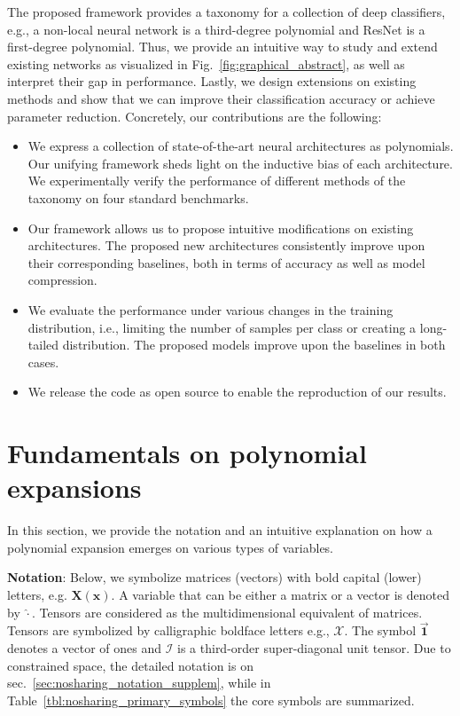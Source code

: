 \documentclass[runningheads]{llncs}
\newcommand{\resnet}{ResNet}
\providecommand{\bmcal}[1]{\bm{\mathcal{#1}}}
\providecommand\eg{e.g.,}
\begin{document}
The proposed framework provides a taxonomy for a collection of deep classifiers, \eg{} a non-local neural network is a third-degree polynomial and \resnet{} is a first-degree polynomial. 
Thus, we provide an intuitive way to study and extend existing networks as visualized in Fig.~\ref{fig:graphical_abstract}, as well as interpret their gap in performance. Lastly, we design extensions on existing methods and show that we can improve their classification accuracy or achieve parameter reduction. 
Concretely, our contributions are the following:
\begin{itemize}
    \item We express a collection of state-of-the-art neural architectures as polynomials. Our unifying framework sheds light on the inductive bias of each architecture. We experimentally verify the performance of different methods of the taxonomy on four standard benchmarks. 
    \item Our framework allows us to propose intuitive modifications on existing architectures. The proposed new architectures consistently improve upon their corresponding baselines, both in terms of accuracy as well as model compression.  
    \item We evaluate the performance under various changes in the training distribution, i.e., limiting the number of samples per class or creating a long-tailed distribution. The proposed models improve upon the baselines in both cases. 
    \item We release the code as open source to enable the reproduction of our results. 
\end{itemize}


 \section{Fundamentals on polynomial expansions}
\label{sec:nosharing_notation_and_intro_to_polynomials}
In this section, we provide the notation and an intuitive explanation on how a polynomial expansion emerges on various types of variables. 




\noindent\textbf{Notation}: Below, 
we symbolize matrices (vectors) with bold capital (lower) letters, e.g. $\bm{X} (\bm{x})$. A variable that can be either a matrix or a vector is denoted by $\hat{\cdot}$. Tensors are considered as the multidimensional equivalent of matrices. Tensors are symbolized by calligraphic boldface letters e.g., $\bmcal{X}$. The symbol $\overrightarrow{\bm{1}}$ denotes a vector of ones and $\bmcal{I}$ is a third-order super-diagonal unit tensor. Due to constrained space, the detailed notation is on sec.~\ref{sec:nosharing_notation_supplem}, while in Table~\ref{tbl:nosharing_primary_symbols} the core symbols are summarized. 
\end{document}
